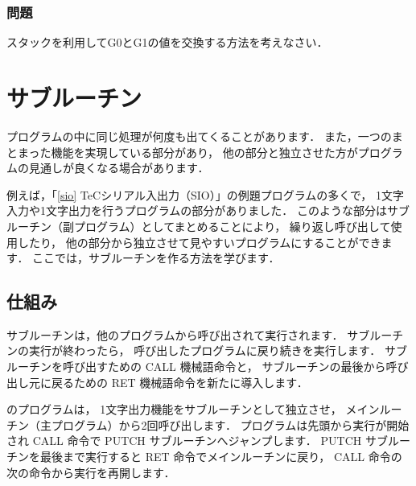 \vfill
\subsubsection{問題}
スタックを利用してG0とG1の値を交換する方法を考えなさい．
\vfill

\newpage
\section{サブルーチン}

プログラムの中に同じ処理が何度も出てくることがあります．
また，一つのまとまった機能を実現している部分があり，
他の部分と独立させた方がプログラムの見通しが良くなる場合があります．

例えば，「\ref{sio} TeCシリアル入出力（SIO）」の例題プログラムの多くで，
1文字入力や1文字出力を行うプログラムの部分がありました．
このような部分はサブルーチン（副プログラム）としてまとめることにより，
繰り返し呼び出して使用したり，
他の部分から独立させて見やすいプログラムにすることができます．
ここでは，サブルーチンを作る方法を学びます．

\subsection{仕組み}

サブルーチンは，他のプログラムから呼び出されて実行されます．
サブルーチンの実行が終わったら，
呼び出したプログラムに戻り続きを実行します．
サブルーチンを呼び出すための CALL 機械語命令と，
サブルーチンの最後から呼び出し元に戻るための RET 機械語命令を新たに導入します．

のプログラムは，
1文字出力機能をサブルーチンとして独立させ，
メインルーチン（主プログラム）から2回呼び出します．
プログラムは先頭から実行が開始され
CALL 命令で PUTCH サブルーチンへジャンプします．
PUTCH サブルーチンを最後まで実行すると
RET 命令でメインルーチンに戻り，
CALL 命令の次の命令から実行を再開します．

